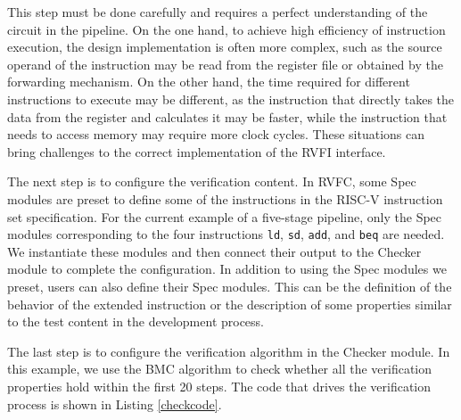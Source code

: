\documentclass[conference]{IEEEtran}
\theoremstyle{definition}
\begin{document}
This step must be done carefully and requires a perfect understanding of the circuit in the pipeline.
On the one hand, to achieve high efficiency of instruction execution, the design implementation is often more complex, such as the source operand of the instruction may be read from the register file or obtained by the forwarding mechanism.
On the other hand, the time required for different instructions to execute may be different, as the instruction that directly takes the data from the register and calculates it may be faster, while the instruction that needs to access memory may require more clock cycles.
These situations can bring challenges to the correct implementation of the RVFI interface.

The next step is to configure the verification content.
In RVFC, some Spec modules are preset to define some of the instructions in the RISC-V instruction set specification.
For the current example of a five-stage pipeline, only the Spec modules corresponding to the four instructions \verb|ld|, \verb|sd|, \verb|add|, and \verb|beq| are needed.
We instantiate these modules and then connect their output to the Checker module to complete the configuration.
In addition to using the Spec modules we preset, users can also define their Spec modules.
This can be the definition of the behavior of the extended instruction or the description of some properties similar to the test content in the development process.

The last step is to configure the verification algorithm in the Checker module.
In this example, we use the BMC algorithm to check whether all the verification properties hold within the first 20 steps.
The code that drives the verification process is shown in Listing \ref{checkcode}.
\end{document}
